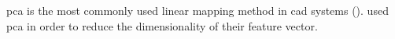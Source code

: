 \ac{pca} is the most commonly used linear mapping method in \ac{cad} systems (\cite{Jolliffe2002}). %
%
%
%
%
%
\cite{Tiwari2008,Tiwari2009,Tiwari2012} used \ac{pca} in order to reduce the dimensionality of their feature vector.

